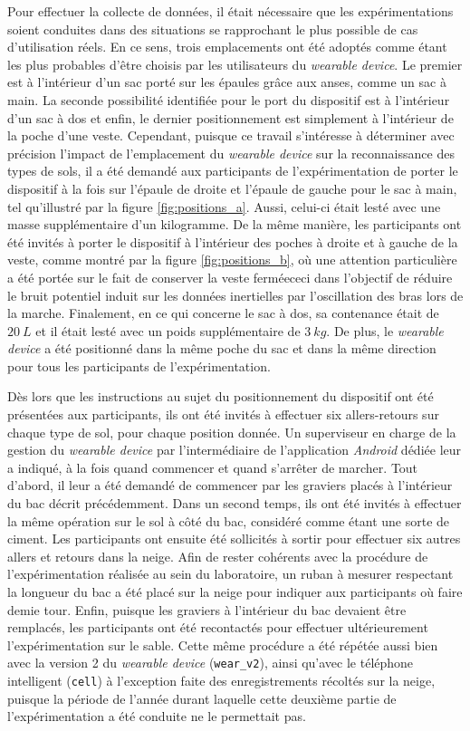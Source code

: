 Pour effectuer la collecte de données, il était nécessaire que les expérimentations soient conduites dans des situations se rapprochant le plus possible de cas d'utilisation réels. En ce sens, trois emplacements ont été adoptés comme étant les plus probables d'être choisis par les utilisateurs du \textit{wearable device}. Le premier est à l'intérieur d'un sac porté sur les épaules grâce aux anses, comme un sac à main. La seconde possibilité identifiée pour le port du dispositif est à l'intérieur d'un sac à dos et enfin, le dernier positionnement est simplement à l'intérieur de la poche d'une veste. Cependant, puisque ce travail s'intéresse à déterminer avec précision l'impact de l'emplacement du \textit{wearable device} sur la reconnaissance des types de sols, il a été demandé aux participants de l'expérimentation de porter le dispositif à la fois sur l'épaule de droite et l'épaule de gauche pour le sac à main, tel qu'illustré par la figure \ref{fig:positions_a}. Aussi, celui-ci était lesté avec une masse supplémentaire d'un kilogramme. De la même manière, les participants ont été invités à porter le dispositif à l'intérieur des poches à droite et à gauche de la veste, comme montré par la figure \ref{fig:positions_b}, où une attention particulière a été portée sur le fait de conserver la veste fermée\textemdash ceci dans l'objectif de réduire le bruit potentiel induit sur les données inertielles par l'oscillation des bras lors de la marche. Finalement, en ce qui concerne le sac à dos, sa contenance était de $20\:L$ et il était lesté avec un poids supplémentaire de $3\:kg$. De plus, le \textit{wearable device} a été positionné dans la même poche du sac et dans la même direction pour tous les participants de l'expérimentation.

Dès lors que les instructions au sujet du positionnement du dispositif ont été présentées aux participants, ils ont été invités à effectuer six allers-retours sur chaque type de sol, pour chaque position donnée. Un superviseur en charge de la gestion du \textit{wearable device} par l'intermédiaire de l’application \textit{Android} dédiée leur a indiqué, à la fois quand commencer et quand s’arrêter de marcher. Tout d'abord, il leur a été demandé de commencer par les graviers placés à l'intérieur du bac décrit précédemment. Dans un second temps, ils ont été invités à effectuer la même opération sur le sol à côté du bac, considéré comme étant une sorte de ciment. Les participants ont ensuite été sollicités à sortir pour effectuer six autres allers et retours dans la neige. Afin de rester cohérents avec la procédure de l'expérimentation réalisée au sein du laboratoire, un ruban à mesurer respectant la longueur du bac a été placé sur la neige pour indiquer aux participants où faire demie tour. Enfin, puisque les graviers à l'intérieur du bac devaient être remplacés, les participants ont été recontactés pour effectuer ultérieurement l'expérimentation sur le sable. Cette même procédure a été répétée aussi bien avec la version 2 du \textit{wearable device} (\texttt{wear\_v2}), ainsi qu'avec le téléphone intelligent (\texttt{cell}) à l'exception faite des enregistrements récoltés sur la neige, puisque la période de l'année durant laquelle cette deuxième partie de l'expérimentation a été conduite ne le permettait pas.

